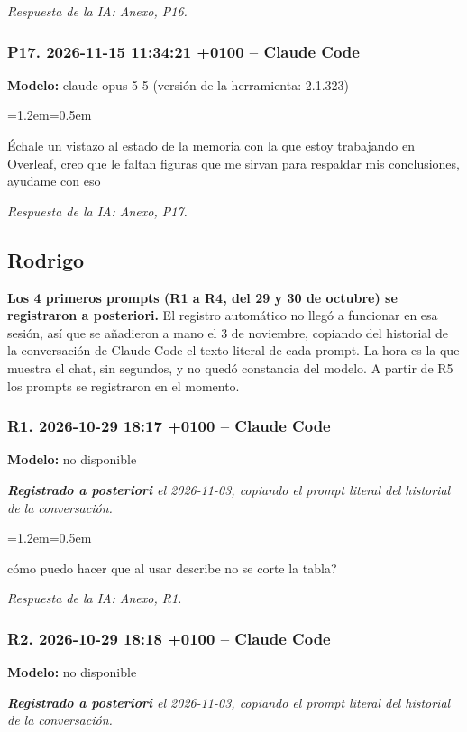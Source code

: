 \documentclass[11pt,a4paper]{article}
\newenvironment{prompt}
  {\par\smallskip\begin{list}{}{\leftmargin=1.2em\rightmargin=0.5em}\item\relax\small\color{black!80}}
  {\end{list}\smallskip}
\begin{document}
\textit{Respuesta de la IA: Anexo, P16.}

\subsubsection*{P17. 2026-11-15 11:34:21 +0100 -- Claude Code}
\textbf{Modelo:} claude-opus-5-5 (versión de la herramienta: 2.1.323)

\begin{prompt}
Échale un vistazo al estado de la memoria con la que estoy trabajando en Overleaf, creo que le faltan figuras que me sirvan para respaldar mis conclusiones, ayudame con eso
\end{prompt}

\textit{Respuesta de la IA: Anexo, P17.}


\subsection{Rodrigo}\label{sec:rodrigo}
\textbf{Los 4 primeros prompts (R1 a R4, del 29 y 30 de octubre) se registraron a posteriori.} El
registro automático no llegó a funcionar en esa sesión, así que se añadieron a mano el 3 de noviembre,
copiando del historial de la conversación de Claude Code el texto literal de cada prompt. La hora es la
que muestra el chat, sin segundos, y no quedó constancia del modelo. A partir de R5 los prompts se
registraron en el momento.

\subsubsection*{R1. 2026-10-29 18:17 +0100 -- Claude Code}
\textbf{Modelo:} no disponible

\textit{\textbf{Registrado a posteriori} el 2026-11-03, copiando el prompt literal del historial de la conversación.}

\begin{prompt}
cómo puedo hacer que al usar describe no se corte la tabla?
\end{prompt}

\textit{Respuesta de la IA: Anexo, R1.}

\subsubsection*{R2. 2026-10-29 18:18 +0100 -- Claude Code}
\textbf{Modelo:} no disponible

\textit{\textbf{Registrado a posteriori} el 2026-11-03, copiando el prompt literal del historial de la conversación.}
\end{document}
